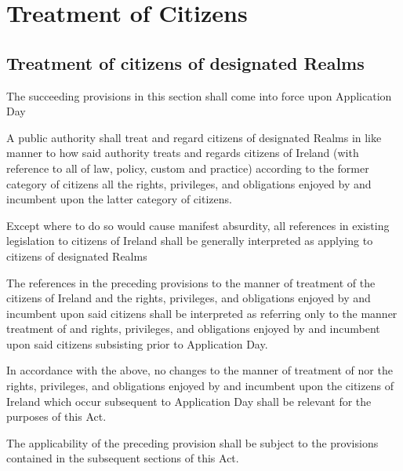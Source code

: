 \documentclass{ukbill}
\begin{document}
\chapter{Treatment of Citizens}
	
\section{Treatment of citizens of designated Realms}


\begin{numstat}
\item The succeeding provisions in this section shall come into force upon Application Day
\item  A public authority shall treat and regard citizens of designated Realms in like manner to how said authority treats and regards  citizens of Ireland (with reference to  all of law, policy, custom and practice) according to the former category of citizens all the rights, privileges, and obligations enjoyed by and incumbent upon the latter category of citizens.
\item Except where to do so would cause manifest absurdity,  all references in existing legislation to citizens of Ireland shall be generally interpreted as applying to citizens of designated Realms
 \begin{alphstat}
\item	The references in the preceding provisions  to the manner of treatment of the citizens of Ireland and the rights, privileges, and obligations enjoyed by and incumbent upon said citizens shall be interpreted as referring only to the manner treatment of and rights, privileges, and obligations enjoyed by and incumbent upon said citizens subsisting prior to Application Day.
\item In accordance with the above, no changes to the manner of treatment of nor the rights, privileges, and obligations enjoyed by and incumbent upon the citizens of Ireland which occur subsequent to Application Day shall be relevant for the purposes of this Act.
	
\end{alphstat}
\item The applicability of the preceding provision shall be subject to the provisions contained in the subsequent sections of this Act. \end{numstat}
\end{document}
